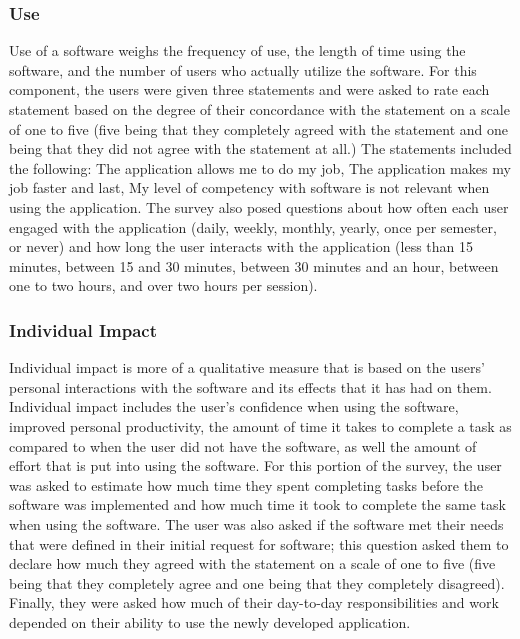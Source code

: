 \subsubsection{Use}
Use of a software weighs the frequency of use, the length of time using the software, and the number of users who actually utilize the software. For this component, the users were given three statements and were asked to rate each statement based on the degree of  their concordance with the statement on a scale of one to five (five being that they completely agreed with the statement and one being that they did not agree with the statement at all.) The statements included the following: The application allows me to do my job, The application makes my job faster and last, My level of competency with software is not relevant when using the application. The survey also posed questions about how often each user engaged with the application (daily, weekly, monthly, yearly, once per semester, or never)  and how long the user interacts with the application (less than 15 minutes, between 15 and 30 minutes, between 30 minutes and an hour, between one to two hours, and over two hours per session).

\paragraph{}

\subsubsection{Individual Impact}
Individual impact is more of a qualitative measure that is based on the users' personal interactions with the software and its effects that it has had on them. Individual impact includes the user's confidence when using the software, improved personal productivity, the amount of time it takes to complete a task as compared to when the user did not have the software, as well the amount of effort that is put into using the software. For this portion of the survey, the user was asked to estimate how much time they spent completing tasks before the software was implemented and how much time it took to complete the same task when using the software. The user was also asked if the software met their needs that were defined in their initial request for software; this question asked them to declare how much they agreed with the statement on a scale of one to five (five being that they completely agree and one being that they  completely disagreed). Finally, they were asked how much of their day-to-day responsibilities and work depended on their ability to use the newly developed application.

